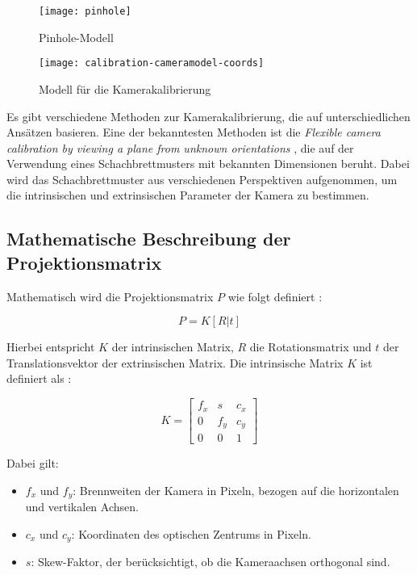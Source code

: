 \begin{figure}[h]
    \centering
    \begin{minipage}{0.45\textwidth}
        \centering
        \texttt{[image: pinhole]}
        \caption{Pinhole-Modell \cite{mw2024calibration}\label{fig:Pinhole}}
    \end{minipage}
    \hfill
    \begin{minipage}{0.45\textwidth}
        \centering
        \texttt{[image: calibration-cameramodel-coords]}
        \caption{Modell für die Kamerakalibrierung \cite{mw2024calibration}\label{fig:Kalibrierung}}
    \end{minipage}
\end{figure}

Es gibt verschiedene Methoden zur Kamerakalibrierung, die auf unterschiedlichen Ansätzen basieren. Eine der bekanntesten Methoden ist die \emph{Flexible camera calibration by viewing a plane from unknown orientations} \cite{zhang1999calibration}, die auf der Verwendung eines Schachbrettmusters mit bekannten Dimensionen beruht. Dabei wird das Schachbrettmuster aus verschiedenen Perspektiven aufgenommen, um die intrinsischen und extrinsischen Parameter der Kamera zu bestimmen. \cite{stachniss2021calibration, zhang1999calibration}

\subsection{Mathematische Beschreibung der Projektionsmatrix}

Mathematisch wird die Projektionsmatrix \(P\) wie folgt definiert \cite{mw2024calibration, szeliski2022computerVision}:

\[
P = K[R|t]
\]

Hierbei entspricht \(K\) der intrinsischen Matrix, \(R\) die Rotationsmatrix und \(t\) der Translationsvektor der extrinsischen Matrix. Die intrinsische Matrix \(K\) ist definiert als \cite{mw2024calibration}:

\[
K = 
\begin{bmatrix}
f_x & s & c_x \\
0 & f_y & c_y \\
0 & 0 & 1
\end{bmatrix}
\]

Dabei gilt:

\begin{itemize}
    \item \( f_x \) und \( f_y \): Brennweiten der Kamera in Pixeln, bezogen auf die horizontalen und vertikalen Achsen.
    \item \( c_x \) und \( c_y \): Koordinaten des optischen Zentrums in Pixeln.
    \item \( s \): Skew-Faktor, der berücksichtigt, ob die Kameraachsen orthogonal sind.
\end{itemize}

